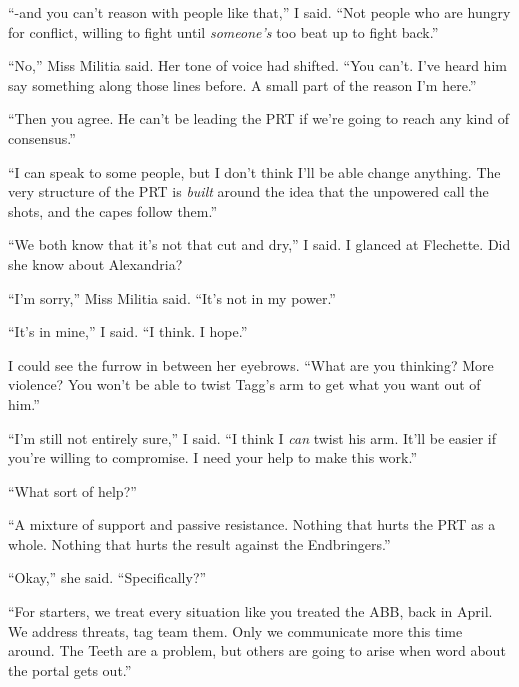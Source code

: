 ``-and you can't reason with people like that,'' I said.  ``Not people who are hungry for conflict, willing to fight until \emph{someone's} too beat up to fight back.''



``No,'' Miss Militia said.  Her tone of voice had shifted.  ``You can't.  I've heard him say something along those lines before.  A small part of the reason I'm here.''



``Then you agree.  He can't be leading the PRT if we're going to reach any kind of consensus.''



``I can speak to some people, but I don't think I'll be able change anything.  The very structure of the PRT is \emph{built} around the idea that the unpowered call the shots, and the capes follow them.''



``We both know that it's not that cut and dry,'' I said.  I glanced at Flechette.  Did she know about Alexandria?



``I'm sorry,'' Miss Militia said.  ``It's not in my power.''



``It's in mine,'' I said.  ``I think.  I hope.''



I could see the furrow in between her eyebrows.  ``What are you thinking?  More violence?  You won't be able to twist Tagg's arm to get what you want out of him.''



``I'm still not entirely sure,'' I said.  ``I think I \emph{can} twist his arm.  It'll be easier if you're willing to compromise.  I need your help to make this work.''



``What sort of help?''



``A mixture of support and passive resistance.  Nothing that hurts the PRT as a whole.  Nothing that hurts the result against the Endbringers.''



``Okay,'' she said.  ``Specifically?''



``For starters, we treat every situation like you treated the ABB, back in April.  We address threats, tag team them.  Only we communicate more this time around.  The Teeth are a problem, but others are going to arise when word about the portal gets out.''



